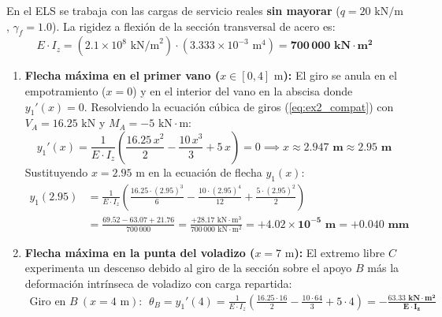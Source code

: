{    

    En el ELS se trabaja con las cargas de servicio reales \textbf{sin mayorar} ($q = 20\text{ kN/m}$, $\gamma_f = 1.0$).
    La rigidez a flexión de la sección transversal de acero es:
    \begin{equation}
        E \cdot I_z = (2.1 \times 10^8\text{ kN/m}^2) \cdot (3.333 \times 10^{-3}\text{ m}^4) = \mathbf{700\,000\text{ kN}\cdot\text{m}^2}
    \end{equation}

    \begin{enumerate}
        \item \textbf{Flecha máxima en el primer vano ($x \in [0, 4]\text{ m}$):}
              El giro se anula en el empotramiento ($x = 0$) y en el interior del vano en la abscisa donde $y_1'(x) = 0$. Resolviendo la ecuación cúbica de giros (\ref{eq:ex2_compat}) con $V_A = 16.25\text{ kN}$ y $M_A = -5\text{ kN}\cdot\text{m}$:
              \begin{equation}
                  y_1'(x) = \frac{1}{E \cdot I_z}\left(\frac{16.25\,x^2}{2} - \frac{10\,x^3}{3} + 5\,x\right) = 0 \implies x \approx \mathbf{2.947\text{ m}} \approx \mathbf{2.95\text{ m}}
              \end{equation}
              Sustituyendo $x = 2.95\text{ m}$ en la ecuación de flecha $y_1(x)$:
              \begin{align}
                  y_1(2.95) & = \frac{1}{E \cdot I_z}\left(\frac{16.25 \cdot (2.95)^3}{6} - \frac{10 \cdot (2.95)^4}{12} + \frac{5 \cdot (2.95)^2}{2}\right) \nonumber \\
                            & = \frac{69.52 - 63.07 + 21.76}{700\,000} = \frac{+28.17\text{ kN}\cdot\text{m}^3}{700\,000\text{ kN}\cdot\text{m}^2} = \mathbf{+4.02 \times 10^{-5}\text{ m} = +0.040\text{ mm}}
              \end{align}
        \item \textbf{Flecha máxima en la punta del voladizo ($x = 7\text{ m}$):}
              El extremo libre $C$ experimenta un descenso debido al giro de la sección sobre el apoyo $B$ más la deformación intrínseca de voladizo con carga repartida:
              \begin{align}
                  \text{Giro en } B \ (x = 4\text{ m}): \quad & \theta_B = y_1'(4) = \frac{1}{E \cdot I_z}\left(\frac{16.25 \cdot 16}{2} - \frac{10 \cdot 64}{3} + 5 \cdot 4\right) = \mathbf{-\frac{63.33\text{ kN}\cdot\text{m}^2}{E \cdot I_z}} \nonumber \\

\end{align}
\end{enumerate}}
